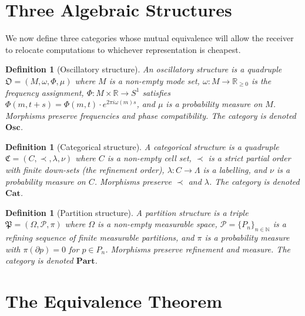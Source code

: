 \documentclass[twocolumn,a4paper]{article}
\newtheorem{definition}[theorem]{Definition}
\newcommand{\Real}{\mathbb{R}}
\newcommand{\Natural}{\mathbb{N}}
\newcommand{\OOsc}{\mathfrak{O}}
\newcommand{\CCat}{\mathfrak{C}}
\newcommand{\PPart}{\mathfrak{P}}
\begin{document}
\section{Three Algebraic Structures}
\label{sec:three-structures}

We now define three categories whose mutual equivalence will allow the receiver to relocate computations to whichever representation is cheapest.

\begin{definition}[Oscillatory structure]
\label{def:osc}
An \emph{oscillatory structure} is a quadruple $\OOsc=(M,\omega,\Phi,\mu)$ where $M$ is a non-empty mode set, $\omega\colon M\to\Real_{\geq 0}$ is the frequency assignment, $\Phi\colon M\times\Real\to S^{1}$ satisfies $\Phi(m,t+s)=\Phi(m,t)\cdot e^{2\pi i\omega(m)s}$, and $\mu$ is a probability measure on $M$. Morphisms preserve frequencies and phase compatibility. The category is denoted $\mathbf{Osc}$.
\end{definition}

\begin{definition}[Categorical structure]
\label{def:cat-struct}
A \emph{categorical structure} is a quadruple $\CCat=(C,\prec,\lambda,\nu)$ where $C$ is a non-empty cell set, $\prec$ is a strict partial order with finite down-sets (the refinement order), $\lambda\colon C\to\Lambda$ is a labelling, and $\nu$ is a probability measure on $C$. Morphisms preserve $\prec$ and $\lambda$. The category is denoted $\mathbf{Cat}$.
\end{definition}

\begin{definition}[Partition structure]
\label{def:part-struct}
A \emph{partition structure} is a triple $\PPart=(\Omega,\mathscr{P},\pi)$ where $\Omega$ is a non-empty measurable space, $\mathscr{P}=\{P_{n}\}_{n\in\Natural}$ is a refining sequence of finite measurable partitions, and $\pi$ is a probability measure with $\pi(\partial p)=0$ for $p\in P_{n}$. Morphisms preserve refinement and measure. The category is denoted $\mathbf{Part}$.
\end{definition}

\section{The Equivalence Theorem}
\label{sec:equivalence}
\end{document}

